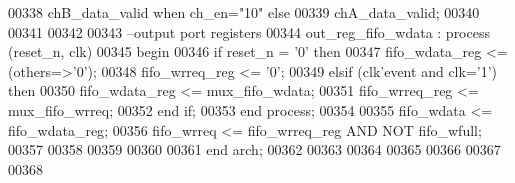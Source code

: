\begin{DoxyCode}
00338                     \textcolor{vhdlchar}{chB_data_valid} \textcolor{keywordflow}{when} \textcolor{vhdlchar}{ch_en}\textcolor{vhdlchar}{=}\textcolor{vhdllogic}{"10"} \textcolor{keywordflow}{else}
00339                     \textcolor{vhdlchar}{chA_data_valid};
00340                      
00341             
00342                      
00343 \textcolor{keyword}{ --output port registers    }
00344 out\_reg\_fifo\_wdata : \textcolor{keywordflow}{process} (reset_n, clk)
00345 \textcolor{vhdlkeyword}{begin}
00346    \textcolor{keywordflow}{if} \textcolor{vhdlchar}{reset_n} \textcolor{vhdlchar}{=} \textcolor{vhdlchar}{'}\textcolor{vhdllogic}{}\textcolor{vhdllogic}{0}\textcolor{vhdlchar}{'} \textcolor{keywordflow}{then} 
00347       \textcolor{vhdlchar}{fifo_wdata_reg} \textcolor{vhdlchar}{<=} \textcolor{vhdlchar}{(}\textcolor{keywordflow}{others}\textcolor{vhdlchar}{=}\textcolor{vhdlchar}{>}\textcolor{vhdlchar}{'}\textcolor{vhdllogic}{}\textcolor{vhdllogic}{0}\textcolor{vhdlchar}{'}\textcolor{vhdlchar}{)};
00348       \textcolor{vhdlchar}{fifo_wrreq_reg} \textcolor{vhdlchar}{<=} \textcolor{vhdlchar}{'}\textcolor{vhdllogic}{}\textcolor{vhdllogic}{0}\textcolor{vhdlchar}{'};
00349    \textcolor{keywordflow}{elsif} \textcolor{vhdlchar}{(}\textcolor{vhdlchar}{clk}\textcolor{vhdlchar}{'}\textcolor{vhdlkeyword}{event} \textcolor{keywordflow}{and} \textcolor{vhdlchar}{clk}\textcolor{vhdlchar}{=}\textcolor{vhdlchar}{'}\textcolor{vhdllogic}{}\textcolor{vhdllogic}{1}\textcolor{vhdlchar}{'}\textcolor{vhdlchar}{)} \textcolor{keywordflow}{then} 
00350       \textcolor{vhdlchar}{fifo_wdata_reg} \textcolor{vhdlchar}{<=} \textcolor{vhdlchar}{mux_fifo_wdata};
00351       \textcolor{vhdlchar}{fifo_wrreq_reg} \textcolor{vhdlchar}{<=} \textcolor{vhdlchar}{mux_fifo_wrreq};
00352    \textcolor{keywordflow}{end} \textcolor{keywordflow}{if};
00353 \textcolor{keywordflow}{end} \textcolor{keywordflow}{process}; 
00354 
00355 \textcolor{vhdlchar}{fifo_wdata} \textcolor{vhdlchar}{<=} \textcolor{vhdlchar}{fifo_wdata_reg};
00356 \textcolor{vhdlchar}{fifo_wrreq} \textcolor{vhdlchar}{<=} \textcolor{vhdlchar}{fifo_wrreq_reg} \textcolor{keywordflow}{AND} \textcolor{keywordflow}{NOT} \textcolor{vhdlchar}{fifo_wfull};             
00357 
00358         
00359         
00360 
00361 \textcolor{keywordflow}{end} \textcolor{vhdlchar}{arch};   
00362 
00363 
00364 
00365 
00366 
00367 
00368 
\end{DoxyCode}
